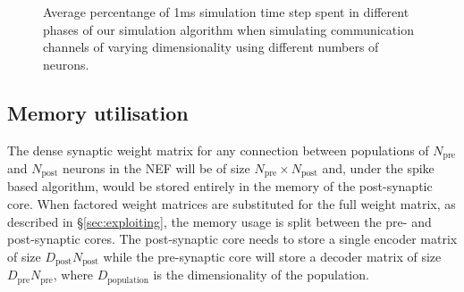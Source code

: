\documentclass[conference]{IEEEtran}
\begin{document}

  \begin{figure}[!t]
    \centering
    \hfil
    \caption{Average percentange of 1ms simulation time step spent in different phases of our simulation algorithm when simulating communication channels of varying dimensionality using different numbers of neurons.}
    \label{fig:results/comm-channel-cpu}
  \end{figure}

  \subsection{Memory utilisation}

  The dense synaptic weight matrix for any connection between populations of $N_\mathrm{pre}$ and $N_\mathrm{post}$ neurons in the NEF will be of size $N_\mathrm{pre} \times N_\mathrm{post}$ and, under the spike based algorithm, would be stored entirely in the memory of the post-synaptic core.
  When factored weight matrices are substituted for the full weight matrix, as described in \S\ref{sec:exploiting}, the memory usage is split between the pre- and post-synaptic cores.
  The post-synaptic core needs to store a single encoder matrix of size $D_\mathrm{post} N_\mathrm{post}$ while the pre-synaptic core will store a decoder matrix of size $D_\mathrm{pre} N_\mathrm{pre}$, where $D_\mathrm{population}$ is the dimensionality of the population.
\end{document}
